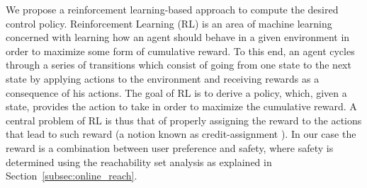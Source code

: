 
We propose a reinforcement learning-based approach to compute the desired control policy.
Reinforcement Learning (RL) is an area of machine learning concerned with learning how an agent should behave in a given environment in order to maximize some form of cumulative reward. To this end, an agent cycles through a series of transitions which consist of going from one state to the next state by applying actions to the environment and receiving rewards as a consequence of his actions. The goal of RL is to derive a policy, which, given a state, provides the action to take in order to maximize the cumulative reward.
A central problem of RL is thus that of properly assigning the reward to the actions that lead to such reward (a notion known as credit-assignment \cite{kaelbling1996reinforcement, sutton1998reinforcement}). In our case the reward is a combination between user preference and safety, where safety is determined using the reachability set analysis as explained in Section~\ref{subsec:online_reach}.

